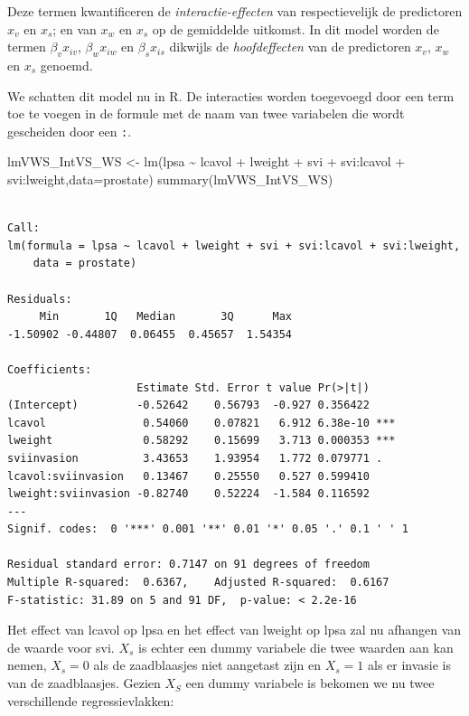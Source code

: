 \documentclass[
  dutch,
  letterpaper,
  12pt]{book}
\newenvironment{Shaded}{\begin{snugshade}}{\end{snugshade}}
\newcommand{\AttributeTok}[1]{\textcolor[rgb]{0.40,0.45,0.13}{#1}}
\newcommand{\FunctionTok}[1]{\textcolor[rgb]{0.28,0.35,0.67}{#1}}
\newcommand{\NormalTok}[1]{\textcolor[rgb]{0.00,0.23,0.31}{#1}}
\newcommand{\OtherTok}[1]{\textcolor[rgb]{0.00,0.23,0.31}{#1}}
\newcommand{\SpecialCharTok}[1]{\textcolor[rgb]{0.37,0.37,0.37}{#1}}
\theoremstyle{definition}
\theoremstyle{definition}
\theoremstyle{definition}
\theoremstyle{remark}
\begin{document}
Deze termen kwantificeren de \emph{interactie-effecten} van
respectievelijk de predictoren \(x_v\) en \(x_s\); en van \(x_w\) en
\(x_s\) op de gemiddelde uitkomst. In dit model worden de termen
\(\beta_vx_{iv}\), \(\beta_wx_{iw}\) en \(\beta_sx_{is}\) dikwijls de
\emph{hoofdeffecten} van de predictoren \(x_v\), \(x_w\) en \(x_s\)
genoemd.

We schatten dit model nu in R. De interacties worden toegevoegd door een
term toe te voegen in de formule met de naam van twee variabelen die
wordt gescheiden door een \texttt{:}.

\begin{Shaded}
\begin{Highlighting}[]
\NormalTok{lmVWS\_IntVS\_WS }\OtherTok{\textless{}{-}} \FunctionTok{lm}\NormalTok{(lpsa }\SpecialCharTok{\textasciitilde{}}\NormalTok{ lcavol }\SpecialCharTok{+}\NormalTok{ lweight }\SpecialCharTok{+}\NormalTok{ svi }\SpecialCharTok{+}\NormalTok{ svi}\SpecialCharTok{:}\NormalTok{lcavol }\SpecialCharTok{+}\NormalTok{ svi}\SpecialCharTok{:}\NormalTok{lweight,}\AttributeTok{data=}\NormalTok{prostate)}
\FunctionTok{summary}\NormalTok{(lmVWS\_IntVS\_WS)}
\end{Highlighting}
\end{Shaded}

\begin{verbatim}

Call:
lm(formula = lpsa ~ lcavol + lweight + svi + svi:lcavol + svi:lweight, 
    data = prostate)

Residuals:
     Min       1Q   Median       3Q      Max 
-1.50902 -0.44807  0.06455  0.45657  1.54354 

Coefficients:
                    Estimate Std. Error t value Pr(>|t|)    
(Intercept)         -0.52642    0.56793  -0.927 0.356422    
lcavol               0.54060    0.07821   6.912 6.38e-10 ***
lweight              0.58292    0.15699   3.713 0.000353 ***
sviinvasion          3.43653    1.93954   1.772 0.079771 .  
lcavol:sviinvasion   0.13467    0.25550   0.527 0.599410    
lweight:sviinvasion -0.82740    0.52224  -1.584 0.116592    
---
Signif. codes:  0 '***' 0.001 '**' 0.01 '*' 0.05 '.' 0.1 ' ' 1

Residual standard error: 0.7147 on 91 degrees of freedom
Multiple R-squared:  0.6367,    Adjusted R-squared:  0.6167 
F-statistic: 31.89 on 5 and 91 DF,  p-value: < 2.2e-16
\end{verbatim}

Het effect van lcavol op lpsa en het effect van lweight op lpsa zal nu
afhangen van de waarde voor svi. \(X_s\) is echter een dummy variabele
die twee waarden aan kan nemen, \(X_s=0\) als de zaadblaasjes niet
aangetast zijn en \(X_s=1\) als er invasie is van de zaadblaasjes.
Gezien \(X_S\) een dummy variabele is bekomen we nu twee verschillende
regressievlakken:
\end{document}
